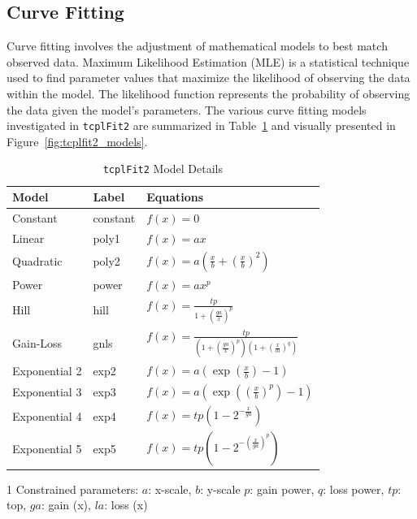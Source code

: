 \subsection{Curve Fitting}
Curve fitting involves the adjustment of mathematical models to best match observed data. Maximum Likelihood Estimation (MLE) is a statistical technique used to find parameter values that maximize the likelihood of observing the data within the model. The likelihood function represents the probability of observing the data given the model's parameters. The various curve fitting models investigated in \texttt{tcplFit2} are summarized in Table~\ref{tab:tcplfit2_models} and visually presented in Figure~\ref{fig:tcplfit2_models}.


\begin{table}
    \centering
    \begin{threeparttable}[b]
    \caption{\texttt{tcplFit2} Model Details}
    \begin{tabular}{lll}
    \toprule
    \textbf{Model} & \textbf{Label} & \textbf{Equations\tnote{1}} \\
    \midrule
    Constant & constant & \(f(x) = 0\) \\ 
    Linear & poly1 & \(f(x) = ax\) \\ 
    Quadratic & poly2 & \(f(x) = a\left(\frac{x}{b} + {\left(\frac{x}{b}\right)}^{2}\right)\) \\ 
    Power & power & \(f(x) = ax^p\) \\ 
    Hill & hill & \(f(x) = \frac{tp}{1 + {\left(\frac{ga}{x}\right)}^{p}}\) \\ 
    Gain-Loss & gnls & \(f(x) = \frac{tp}{(1 + {\left(\frac{ga}{x}\right)}^{p})(1 + {\left(\frac{x}{la}\right)}^{q})}\) \\ 
    Exponential 2 & exp2 & \(f(x) = a\left(\exp\left(\frac{x}{b}\right) - 1\right)\) \\
    Exponential 3 & exp3 & \(f(x) = a\left(\exp\left({\left(\frac{x}{b}\right)}^{p}\right) - 1\right)\) \\
    Exponential 4 & exp4 & \(f(x) = tp\left(1 - 2^{-\frac{x}{ga}}\right)\) \\
    Exponential 5 & exp5 & \(f(x) = tp{\left(1 - 2^{-(\frac{x}{ga})^{p}}\right)}\) \\
    \bottomrule
    \end{tabular}
    \begin{tablenotes}
        \item [1] Constrained parameters: $a$: x-scale, $b$: y-scale $p$: gain power, $q$: loss power, $tp$: top, $ga$: gain (x), $la$: loss (x)
    \end{tablenotes}
~\label{tab:tcplfit2_models}
\end{threeparttable}
\end{table}

